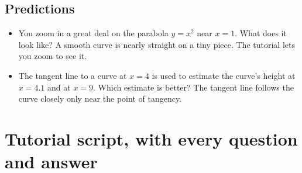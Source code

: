 \documentclass[11pt]{article}
\begin{document}
\subsection*{Predictions}\begin{itemize}
\item You zoom in a great deal on the parabola $y=x^2$ near $x=1$. What does it look like?  A smooth curve is nearly straight on a tiny piece. The tutorial lets you zoom to see it.
\item The tangent line to a curve at $x=4$ is used to estimate the curve's height at $x=4.1$ and at $x=9$. Which estimate is better?  The tangent line follows the curve closely only near the point of tangency.
\end{itemize}
\section*{Tutorial script, with every question and answer}
\end{document}
